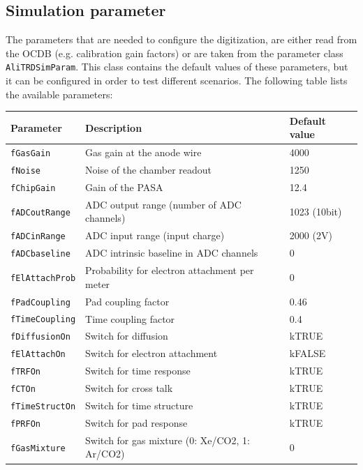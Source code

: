 \documentclass{alicetdr}
\begin{document}
\subsection{Simulation parameter}
%
The parameters that are needed to configure the digitization, are either
read from the OCDB (e.g. calibration gain factors) or are taken from the
parameter class {\tt AliTRDSimParam}. This class contains the default values
of these parameters, but it can be configured in order to test different 
scenarios. The following table lists the available parameters:
%
\begin{center}
\begin{tabular}{lll}
Parameter              & Description                                   & Default value \\ \hline
{\tt fGasGain}         & Gas gain at the anode wire                    & 4000          \\
{\tt fNoise}           & Noise of the chamber readout                  & 1250          \\
{\tt fChipGain}        & Gain of the PASA                              & 12.4          \\
{\tt fADCoutRange}     & ADC output range (number of ADC channels)     & 1023 (10bit)  \\
{\tt fADCinRange}      & ADC input range (input charge)                & 2000 (2V)     \\
{\tt fADCbaseline}     & ADC intrinsic baseline in ADC channels        & 0             \\
{\tt fElAttachProb}    & Probability for electron attachment per meter & 0             \\
{\tt fPadCoupling}     & Pad coupling factor                           & 0.46          \\
{\tt fTimeCoupling}    & Time coupling factor                          & 0.4           \\ \hline
{\tt fDiffusionOn}     & Switch for diffusion                          & kTRUE         \\
{\tt fElAttachOn}      & Switch for electron attachment                & kFALSE        \\
{\tt fTRFOn}           & Switch for time response                      & kTRUE         \\
{\tt fCTOn}            & Switch for cross talk                         & kTRUE         \\
{\tt fTimeStructOn}    & Switch for time structure                     & kTRUE         \\
{\tt fPRFOn}           & Switch for pad response                       & kTRUE         \\
{\tt fGasMixture}      & Switch for gas mixture (0: Xe/CO2, 1: Ar/CO2) & 0             \\
\end{tabular}
\end{center}
%
\end{document}
